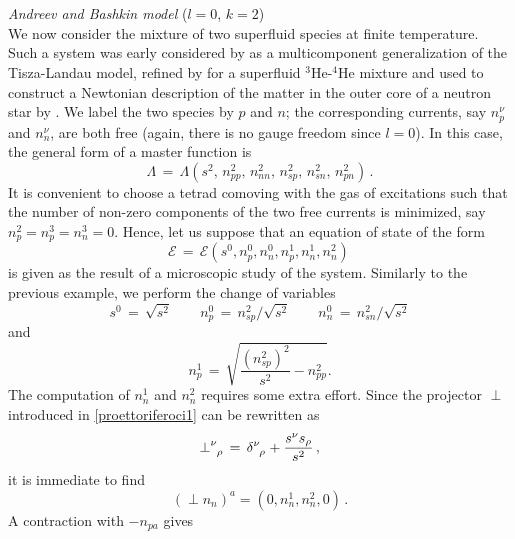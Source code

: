 \documentclass[usenatbib]{mnras}
\begin{document}
\\
\\
\emph{Andreev and Bashkin model} ($l=0$, $k=2$) 
\\
We now consider the mixture of two superfluid species at finite temperature. Such a system was early considered by \cite{khala57} as a multicomponent generalization of the Tisza-Landau model, refined by  \cite{andreevbashkin1976}
for a superfluid $^3$He-$^4$He  mixture and used to construct a Newtonian description of the matter in the outer core of a neutron star by \cite{mendell1991}. We label the two species by $p$ and $n$; the corresponding currents, say $n_p^\nu$ and $n_n^\nu$, are both free (again, there is no gauge freedom since $l=0$). In this case, the general form of a master function is
%
\begin{equation}
\Lambda 
\,  = \, 
\Lambda (  s^2, \, n_{pp}^2,  \, n_{nn}^2,  \, n_{sp}^2,  \, n_{sn}^2,  \,n_{pn}^2 )  \, .
\end{equation}
%
It is convenient to choose a tetrad comoving with the gas of excitations such that the number of non-zero components of the two free currents is minimized, say $n_p^2 = n_p^3 = n_n^3=0$. Hence, let us suppose that an equation of state of the form 
%
\begin{equation}
\mathcal{E}
\,  = \, 
\mathcal{E}( s^0, n_p^0, n_n^0, n_p^1, n_n^1, n_n^2) \, 
\end{equation}
%
is given as the result of a microscopic study of the system. Similarly to the previous example, we perform the change of variables
%
\begin{equation}
\label{tostizeri}
 s^0 \, = \, \sqrt{s^2} 
\qquad 
 n_p^0 \, = \, n_{sp}^2 / \sqrt{s^2}  
\qquad 
 n_n^0 \, = \, n_{sn}^2 / \sqrt{s^2}
\end{equation}
%
and
%
\begin{equation}\label{tostod1}
n_p^1 \, = \, \sqrt{\dfrac{(n_{sp}^2)^2}{s^2} - n_{pp}^2}.
\end{equation}
%
The computation of $n_n^1$ and $n_n^2$ requires some extra effort. Since the projector ${\perp}$ introduced in \eqref{proettoriferoci1} can be rewritten as
%
\begin{equation}
{\perp}\indices{^\nu_\rho} 
\, = \,  
\delta\indices{^\nu _\rho} + \dfrac{s^\nu s_\rho}{s^2} \, ,
\end{equation}
%
it is immediate to find
%
\begin{equation}
({\perp}n_n)^a = (0,n_n^1,n_n^2,0) \, .
\end{equation}
%
A contraction with $-n_{pa}$ gives
\end{document}
